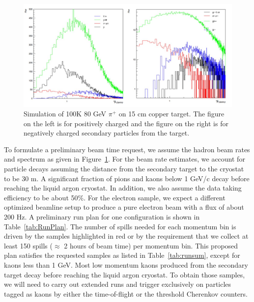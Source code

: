 \begin{figure}[tbh]
  \centering
\includegraphics[scale=0.47]{figures/80GeVPion-15cmCuTarget.jpg}
  \caption{Simulation of 100K 80 GeV $\pi^+$ on 15 cm copper target. The figure on the left is for positively charged and the figure on the right is for negatively charged secondary particles from the target. }
\label{fig:PionOnCuTarget}
\end{figure}

To formulate a preliminary beam time request, we assume the hadron beam rates and spectrum as given in Figure~\ref{fig:PionOnCuTarget}. For the beam rate estimates, we account for particle decays assuming the distance from the secondary target to the cryostat to be 30 m. A significant fraction of pions and kaons below 1 GeV/c decay before reaching the liquid argon cryostat. In addition, we also assume the data taking efficiency to be about 50\%. For the electron sample, we expect a different optimized beamline setup to produce a pure electron beam with a flux of about 200 Hz. A preliminary run plan for one configuration is shown in Table~\ref{tab:RunPlan}. The number of spills needed for each momentum bin is driven by the samples highlighted in red or by the requirement that we collect at least 150 spills ($\approx$ 2 hours of beam time) per momentum bin.  This proposed plan satisfies the requested samples as listed in Table~\ref{tab:runsum}, except for kaons less than 1 GeV. Most low momentum kaons produced from the secondary target decay before reaching the liquid argon cryostat. To obtain those samples, we will need to carry out extended runs and trigger exclusively on particles tagged as kaons by either the time-of-flight or the threshold Cherenkov counters.

